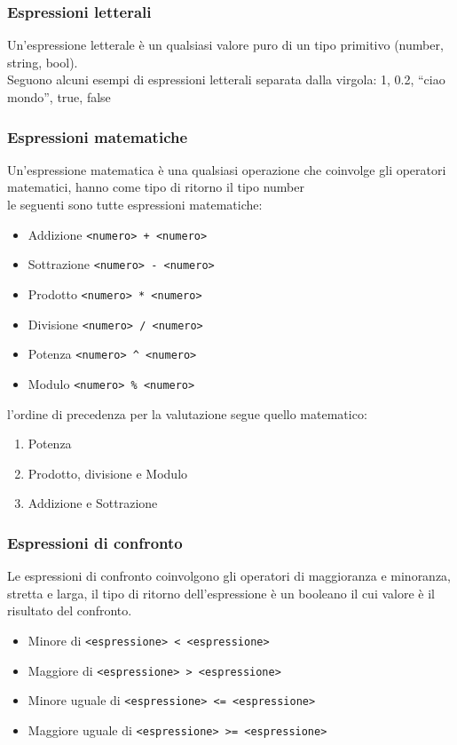 \subsubsection{Espressioni letterali}
Un’espressione letterale è un qualsiasi valore puro di un tipo primitivo (number, string, bool). \\
Seguono alcuni esempi di espressioni letterali separata dalla virgola: 1, 0.2, “ciao mondo”, true, false

\subsubsection{Espressioni matematiche}
Un'espressione matematica è una qualsiasi operazione che coinvolge gli operatori matematici,
hanno come tipo di ritorno il tipo number
\\
le seguenti sono tutte espressioni matematiche:
\begin{itemize}
    \item Addizione \verb|<numero> + <numero>|
    \item Sottrazione \verb|<numero> - <numero>|
    \item Prodotto \verb|<numero> * <numero>|
    \item Divisione \verb|<numero> / <numero>|
    \item Potenza \verb|<numero> ^ <numero>|
    \item Modulo \verb|<numero> % <numero>|
\end{itemize}
l'ordine di precedenza per la valutazione segue quello matematico:
\begin{enumerate}
    \item Potenza
    \item Prodotto, divisione e Modulo
    \item Addizione e Sottrazione
\end{enumerate}

\subsubsection{Espressioni di confronto}
Le espressioni di confronto coinvolgono gli operatori di maggioranza e minoranza, stretta e larga,
il tipo di ritorno dell'espressione è un booleano il cui valore è il risultato del confronto.
\begin{itemize}
    \item Minore di \verb|<espressione> < <espressione>|
    \item Maggiore di \verb|<espressione> > <espressione>|
    \item Minore uguale di \verb|<espressione> <= <espressione>|
    \item Maggiore uguale di \verb|<espressione> >= <espressione>|
\end{itemize}

